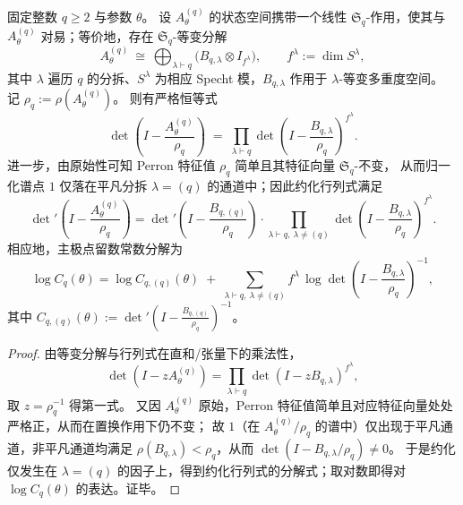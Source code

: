 \begin{proposition}\label{prop:finite-part-reduced-determinant-sq-channel-factorization}
固定整数 \(q\ge 2\) 与参数 \(\theta\)。
设 \(A^{(q)}_\theta\) 的状态空间携带一个线性 \(\mathfrak{S}_q\)-作用，使其与 \(A^{(q)}_\theta\) 对易；等价地，存在 \(\mathfrak{S}_q\)-等变分解
\[
A^{(q)}_\theta\ \cong\ \bigoplus_{\lambda\vdash q}\bigl(B_{q,\lambda}\otimes I_{f^\lambda}\bigr),
\qquad f^\lambda:=\dim S^\lambda,
\]
其中 \(\lambda\) 遍历 \(q\) 的分拆、\(S^\lambda\) 为相应 Specht 模，\(B_{q,\lambda}\) 作用于 \(\lambda\)-等变多重度空间。
记 \(\rho_q:=\rho(A^{(q)}_\theta)\)。
则有严格恒等式
\[
\det\!\left(I-\frac{A^{(q)}_\theta}{\rho_q}\right)
\;=\;
\prod_{\lambda\vdash q}\det\!\left(I-\frac{B_{q,\lambda}}{\rho_q}\right)^{f^\lambda}.
\]
进一步，由原始性可知 Perron 特征值 \(\rho_q\) 简单且其特征向量 \(\mathfrak{S}_q\)-不变，
从而归一化谱点 \(1\) 仅落在平凡分拆 \(\lambda=(q)\) 的通道中；因此约化行列式满足
\[
\det\nolimits'\!\left(I-\frac{A^{(q)}_\theta}{\rho_q}\right)
=
\det\nolimits'\!\left(I-\frac{B_{q,(q)}}{\rho_q}\right)\cdot
\prod_{\lambda\vdash q,\ \lambda\neq(q)}
\det\!\left(I-\frac{B_{q,\lambda}}{\rho_q}\right)^{f^\lambda}.
\]
相应地，主极点留数常数分解为
\[
\log C_q(\theta)
=
\log C_{q,(q)}(\theta)
\;+\;
\sum_{\lambda\vdash q,\ \lambda\neq(q)}
f^\lambda\,\log\det\!\left(I-\frac{B_{q,\lambda}}{\rho_q}\right)^{-1},
\]
其中
\(
C_{q,(q)}(\theta):=\det\nolimits'\!\left(I-\frac{B_{q,(q)}}{\rho_q}\right)^{-1}
\)。
\end{proposition}
\begin{proof}
由等变分解与行列式在直和/张量下的乘法性，
\[
\det(I-zA^{(q)}_\theta)=\prod_{\lambda\vdash q}\det(I-zB_{q,\lambda})^{f^\lambda},
\]
取 \(z=\rho_q^{-1}\) 得第一式。
又因 \(A^{(q)}_\theta\) 原始，Perron 特征值简单且对应特征向量处处严格正，从而在置换作用下仍不变；
故 \(1\)（在 \(A^{(q)}_\theta/\rho_q\) 的谱中）仅出现于平凡通道，非平凡通道均满足 \(\rho(B_{q,\lambda})<\rho_q\)，从而 \(\det(I-B_{q,\lambda}/\rho_q)\neq 0\)。
于是约化仅发生在 \(\lambda=(q)\) 的因子上，得到约化行列式的分解式；取对数即得对 \(\log C_q(\theta)\) 的表达。证毕。
\end{proof}

